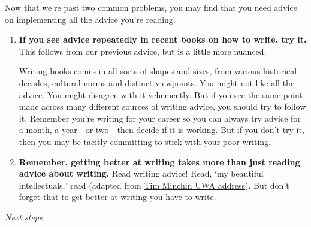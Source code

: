 \documentclass[11pt,letter]{article}
\begin{document}
Now that we're past two common problems, you may find that you need advice on implementing all the advice you're reading.
\begin{enumerate}
\item {\bf If you see advice repeatedly in recent books on how to write, try it.} This follows from our previous advice, but is a little more nuanced. 

Writing books comes in all sorts of shapes and sizes, from various historical decades, cultural norms and distinct viewpoints. You might not like all the advice. You might disagree with it vehemently. But if you see the same point made across many different sources of writing advice, you should try to follow it. Remember you're writing for your career so you can always try advice for a month, a year---or two---then decide if it is working. But if you don't try it, then you may be tacitly committing to stick with your poor writing. 
\item {\bf Remember, getting better at writing takes more than just reading advice about writing.} Read writing advice! Read,  `my beautiful intellectuals,' read (adapted from \href{https://www.youtube.com/watch?v=yoEezZD71sc}{Tim Minchin UWA address}).  But don't forget that to get better at writing you have to write. %
\end{enumerate}

\emph{Next steps}
\end{document}

